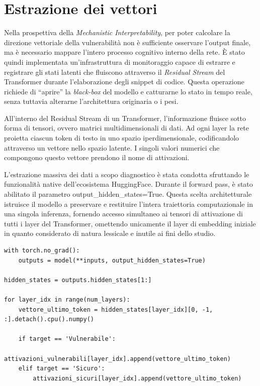 \section{Estrazione dei vettori}
Nella prospettiva della \textit{Mechanistic Interpretability}, per poter calcolare la direzione vettoriale della vulnerabilità non è sufficiente osservare l'output finale, ma è necessario mappare l'intero processo cognitivo interno della rete. È stato quindi implementata un'infrastruttura di monitoraggio capace di estrarre e registrare gli stati latenti che fluiscono attraverso il \textit{Residual Stream} del Transformer durante l'elaborazione degli snippet di codice. Questa operazione richiede di \enquote{aprire} la \textit{black-box} del modello e catturarne lo stato in tempo reale, senza tuttavia alterarne l'architettura originaria o i pesi.

All'interno del Residual Stream di un Transformer, l'informazione fluisce sotto forma di tensori, ovvero matrici multidimensionali di dati. Ad ogni layer la rete proietta ciascun token di testo in uno spazio iperdimensionale, codificandolo attraverso un vettore nello spazio latente. I singoli valori numerici che compongono questo vettore prendono il nome di attivazioni.

L'estrazione massiva dei dati a scopo diagnostico è stata condotta sfruttando le funzionalità native dell'ecosistema HuggingFace. Durante il forward pass, è stato abilitato il parametro output\_hidden\_states=True. Questa scelta architetturale istruisce il modello a preservare e restituire l'intera traiettoria computazionale in una singola inferenza, fornendo accesso simultaneo ai tensori di attivazione di tutti i layer del Transformer, omettendo unicamente il layer di embedding iniziale in quanto considerato di natura lessicale e inutile ai fini dello studio.

\begin{verbatim}
with torch.no_grad():
    outputs = model(**inputs, output_hidden_states=True)

hidden_states = outputs.hidden_states[1:] 

for layer_idx in range(num_layers):
    vettore_ultimo_token = hidden_states[layer_idx][0, -1, :].detach().cpu().numpy()

    if target == 'Vulnerabile':
        attivazioni_vulnerabili[layer_idx].append(vettore_ultimo_token)
    elif target == 'Sicuro':
        attivazioni_sicuri[layer_idx].append(vettore_ultimo_token)

\end{verbatim}

